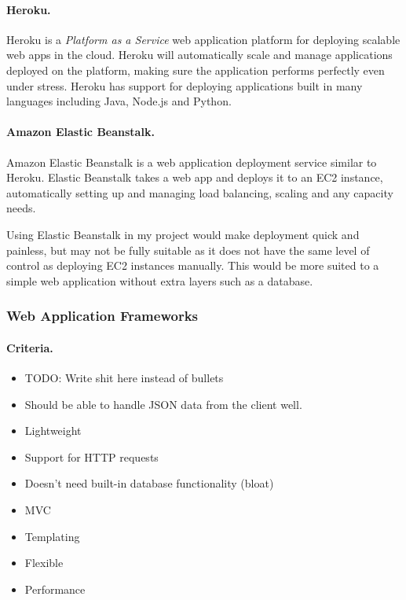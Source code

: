 \documentclass[a4paper, 12pt]{article}
\begin{document}
\paragraph{Heroku.}
Heroku is a \emph{Platform as a Service} web application platform for deploying scalable web apps in the cloud. Heroku will automatically scale and manage applications deployed on the platform, making sure the application performs perfectly even under stress. Heroku has support for deploying applications built in many languages including Java, Node.js and Python.


\paragraph{Amazon Elastic Beanstalk.}
Amazon Elastic Beanstalk is a web application deployment service similar to Heroku. Elastic Beanstalk takes a web app and deploys it to an EC2 instance, automatically setting up and managing load balancing, scaling and any capacity needs.


Using Elastic Beanstalk in my project would make deployment quick and painless, but may not be fully suitable as it does not have the same level of control as deploying EC2 instances manually. This would be more suited to a simple web application without extra layers such as a database.



\subsubsection{Web Application Frameworks}
\paragraph{Criteria.}
\begin{itemize}
\item{TODO: Write shit here instead of bullets}
\item{Should be able to handle JSON data from the client well.}
\item{Lightweight}
\item{Support for HTTP requests}
\item{Doesn’t need built-in database functionality (bloat)}
\item{MVC}
\item{Templating}
\item{Flexible}
\item{Performance}
\end{itemize}
\end{document}

